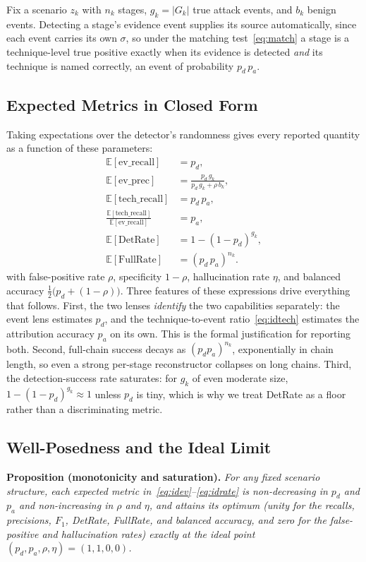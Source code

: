 \documentclass[journal]{IEEEtran}
\begin{document}
Fix a scenario $z_k$ with $n_k$ stages, $g_k=|G_k|$ true attack events, and $b_k$ benign events.
Detecting a stage's evidence event supplies its source automatically, since each event carries its own
$\sigma$, so under the matching test~\eqref{eq:match} a stage is a technique-level true positive exactly
when its evidence is detected \emph{and} its technique is named correctly, an event of probability
$p_d\,p_a$.

\subsection{Expected Metrics in Closed Form}
Taking expectations over the detector's randomness gives every reported quantity as a function of these
parameters:
\begin{align}
\mathbb{E}[\mathrm{ev\_recall}] &= p_d, \label{eq:idev}\\[2pt]
\mathbb{E}[\mathrm{ev\_prec}] &= \frac{p_d\,g_k}{p_d\,g_k+\rho\,b_k}, \label{eq:idprec}\\[2pt]
\mathbb{E}[\mathrm{tech\_recall}] &= p_d\,p_a, \label{eq:idtechrec}\\[2pt]
\frac{\mathbb{E}[\mathrm{tech\_recall}]}{\mathbb{E}[\mathrm{ev\_recall}]} &= p_a, \label{eq:idtech}\\[2pt]
\mathbb{E}[\mathrm{DetRate}] &= 1-(1-p_d)^{g_k}, \label{eq:iddet}\\[2pt]
\mathbb{E}[\mathrm{FullRate}] &= (p_d\,p_a)^{n_k}. \label{eq:idrate}
\end{align}
with false-positive rate $\rho$, specificity $1-\rho$, hallucination rate $\eta$, and balanced accuracy
$\tfrac12\bigl(p_d+(1-\rho)\bigr)$. Three features of these expressions drive everything that follows.
First, the two lenses \emph{identify} the two capabilities separately: the event lens estimates $p_d$,
and the technique-to-event ratio~\eqref{eq:idtech} estimates the attribution accuracy $p_a$ on its own.
This is the formal justification for reporting both. Second, full-chain success decays as
$(p_d p_a)^{n_k}$, exponentially in chain length, so even a strong per-stage reconstructor collapses on
long chains. Third, the detection-success rate saturates: for $g_k$ of even moderate size,
$1-(1-p_d)^{g_k}\approx 1$ unless $p_d$ is tiny, which is why we treat DetRate as a floor rather than a
discriminating metric.

\subsection{Well-Posedness and the Ideal Limit}
\noindent\textbf{Proposition (monotonicity and saturation).} \emph{For any fixed scenario structure,
each expected metric in~\eqref{eq:idev}--\eqref{eq:idrate} is non-decreasing in $p_d$ and $p_a$ and
non-increasing in $\rho$ and $\eta$, and attains its optimum (unity for the recalls, precisions, $F_1$,
DetRate, FullRate, and balanced accuracy, and zero for the false-positive and hallucination rates) exactly
at the ideal point $(p_d,p_a,\rho,\eta)=(1,1,0,0)$.}
\end{document}
